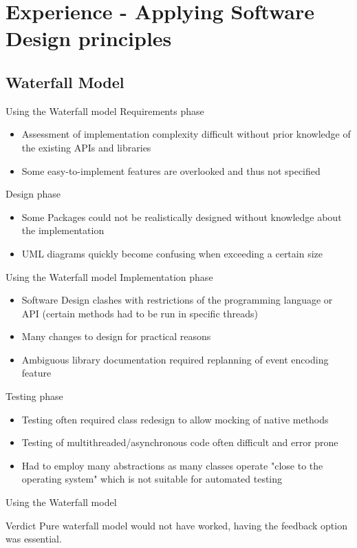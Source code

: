  \section{Experience - Applying Software Design principles}
 \subsection{Waterfall Model}
\begin{frame}{Using the Waterfall model}
Requirements phase
\begin{itemize}
\item Assessment of implementation complexity difficult without prior knowledge of the existing APIs and libraries
\item Some easy-to-implement features are overlooked and thus not specified
\end{itemize}
Design phase
\begin{itemize}
\item Some Packages could not be realistically designed without knowledge about the implementation
\item UML diagrams quickly become confusing when exceeding a certain size
\end{itemize}

\end{frame}
\begin{frame}{Using the Waterfall model}
Implementation phase
\begin{itemize}
\item Software Design clashes with restrictions of the programming language or API (certain methods had to be run in specific threads)
\item Many changes to design for practical reasons
\item Ambiguous library documentation required replanning of event encoding feature
\end{itemize}

Testing phase
\begin{itemize}
\item Testing often required class redesign to allow mocking of native methods
\item Testing of multithreaded/asynchronous code often difficult and error prone
\item Had to employ many abstractions as many classes operate "close to the operating system" which is not suitable for automated testing
\end{itemize}
\end{frame}

\begin{frame}{Using the Waterfall model}
\begin{block}{Verdict}
Pure waterfall model would not have worked, having the feedback option was essential.
\end{block}
\end{frame}